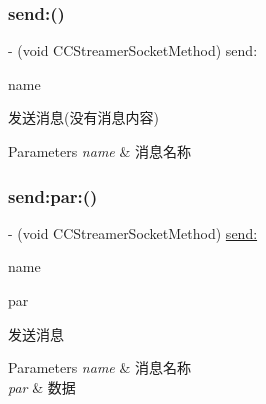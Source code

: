 \subsubsection{\texorpdfstring{send\+:()}{send:()}}
{\footnotesize\ttfamily -\/ (void C\+C\+Streamer\+Socket\+Method) send\+: \begin{DoxyParamCaption}\item[{(N\+S\+String $\ast$)}]{name }\end{DoxyParamCaption}}

发送消息(没有消息内容)


\begin{DoxyParams}{Parameters}
{\em name} & 消息名称 \\
\hline
\end{DoxyParams}
\mbox{\label{protocol_c_c_streamer_socket_method_01-p_aaac7f842265b2ae42b98ce73d3091d0b}} 
\subsubsection{\texorpdfstring{send\+:par\+:()}{send:par:()}}
{\footnotesize\ttfamily -\/ (void C\+C\+Streamer\+Socket\+Method) \hyperlink{protocol_c_c_streamer_socket_method_01-p_a7ead0de5b325c2bfdb890512aafb18bb}{send\+:} \begin{DoxyParamCaption}\item[{(N\+S\+String $\ast$)}]{name }\item[{par:(N\+S\+Dictionary $\ast$)}]{par }\end{DoxyParamCaption}}

发送消息


\begin{DoxyParams}{Parameters}
{\em name} & 消息名称 \\
\hline
{\em par} & 数据 \\
\hline
\end{DoxyParams}
\mbox{\label{protocol_c_c_streamer_socket_method_01-p_aa89da81bd3bdda8374abd942e67bc90d}} 
